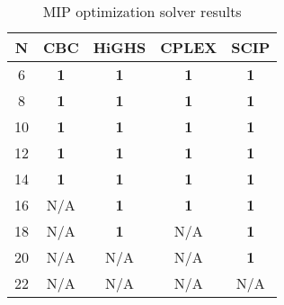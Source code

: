 \begin{table}[htbp]
\centering
\small
{%
\begin{tabular}{|c|c|c|c|c|}
\toprule
\textbf{N} & \textbf{CBC} &\textbf{HiGHS} & \textbf{CPLEX} & \textbf{SCIP} \\
\midrule
6 & \textbf{1} & \textbf{1} & \textbf{1} & \textbf{1} \\
8 & \textbf{1} & \textbf{1} & \textbf{1} & \textbf{1} \\
10 & \textbf{1} & \textbf{1} & \textbf{1} & \textbf{1} \\
12 & \textbf{1} & \textbf{1} & \textbf{1} & \textbf{1} \\
14 & \textbf{1} & \textbf{1} & \textbf{1} & \textbf{1}\\
16 & N/A & \textbf{1} & \textbf{1} & \textbf{1}\\
18 & N/A & \textbf{1} & N/A & \textbf{1}\\
20 & N/A & N/A & N/A & \textbf{1}\\
22 & N/A & N/A & N/A & N/A\\
\bottomrule
\end{tabular}
}
\caption{MIP optimization solver results}
\label{table:mip-results}
\end{table}
